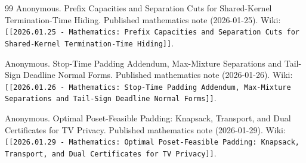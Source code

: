 \documentclass[11pt]{article}
\begin{document}
\begin{thebibliography}{99}
Anonymous.
\newblock Prefix Capacities and Separation Cuts for Shared-Kernel Termination-Time Hiding.
\newblock Published mathematics note (2026-01-25). Wiki: \texttt{[[2026.01.25 - Mathematics: Prefix Capacities and Separation Cuts for Shared-Kernel Termination-Time Hiding]]}.

Anonymous.
\newblock Stop-Time Padding Addendum, Max-Mixture Separations and Tail-Sign Deadline Normal Forms.
\newblock Published mathematics note (2026-01-26). Wiki: \texttt{[[2026.01.26 - Mathematics: Stop-Time Padding Addendum, Max-Mixture Separations and Tail-Sign Deadline Normal Forms]]}.

Anonymous.
\newblock Optimal Poset-Feasible Padding: Knapsack, Transport, and Dual Certificates for TV Privacy.
\newblock Published mathematics note (2026-01-29). Wiki: \texttt{[[2026.01.29 - Mathematics: Optimal Poset-Feasible Padding: Knapsack, Transport, and Dual Certificates for TV Privacy]]}.

\end{thebibliography}
\end{document}
